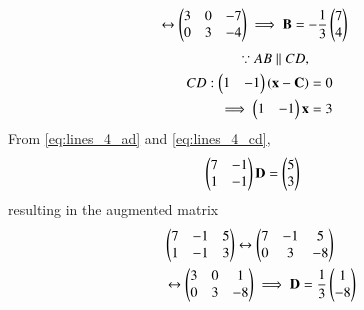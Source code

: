 \documentclass[journal,12pt,twocolumn]{IEEEtran}
\begin{document}
\begin{enumerate}[label=\arabic*]
\begin{align}
&\leftrightarrow
 \begin{pmatrix}3 & 0 & -7\\ 0 & 3 & -4\end{pmatrix} \implies \mathbf{B} = -\frac{1}{3}\begin{pmatrix}7\\4\end{pmatrix}
\end{align}
\begin{align}
\because AB \parallel CD,&
\nonumber \\
CD: \begin{pmatrix}1 & -1\end{pmatrix}\left(\mathbf{x}-\mathbf{C}\right) &=0
\nonumber \\
\implies \begin{pmatrix}1 & -1\end{pmatrix}\mathbf{x} &=3
\label{eq:lines_4_cd}
\end{align}
%
From \eqref{eq:lines_4_ad} and \eqref{eq:lines_4_cd},
\begin{align}
 \begin{pmatrix}7 & -1 \\ 1 & -1\end{pmatrix}\mathbf{D} &=\begin{pmatrix}5 \\ 3\end{pmatrix}
\end{align}
resulting in the augmented matrix
\begin{align}
& \begin{pmatrix}7 & -1 & 5\\ 1 & -1 & 3\end{pmatrix} 
\leftrightarrow
 \begin{pmatrix}7 & -1 & 5\\ 0 & 3 & -8\end{pmatrix} 
\nonumber \\
&\leftrightarrow
 \begin{pmatrix}3 & 0 & 1\\ 0 & 3 & -8\end{pmatrix} \implies \mathbf{D} = \frac{1}{3}\begin{pmatrix}1\\-8\end{pmatrix}
\end{align}

%


\end{enumerate}
\end{document}
